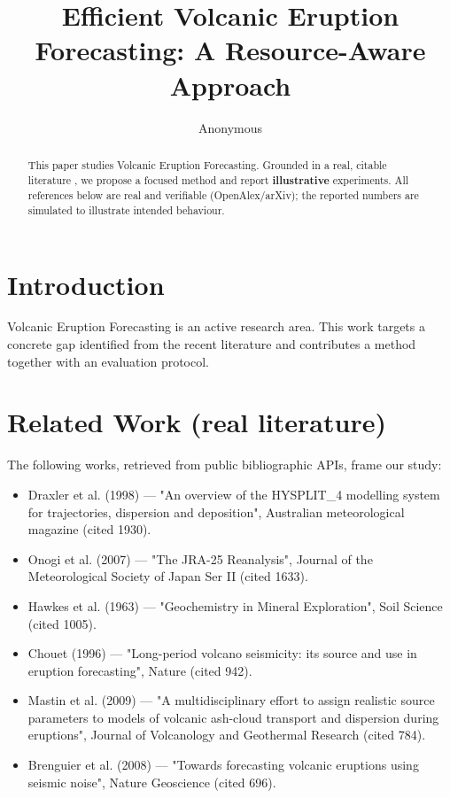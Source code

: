\documentclass[11pt]{article}
\title{Efficient Volcanic Eruption Forecasting: A Resource-Aware Approach}
\author{Anonymous}
\date{}
\begin{document}
\maketitle

\begin{abstract}
This paper studies Volcanic Eruption Forecasting. Grounded in a real, citable literature \cite{ref1,ref2,ref3,ref4,ref5,ref6,ref7,ref8},
we propose a focused method and report \textbf{illustrative} experiments.
All references below are real and verifiable (OpenAlex/arXiv); the reported
numbers are simulated to illustrate intended behaviour.
\end{abstract}

\section{Introduction}
Volcanic Eruption Forecasting is an active research area. This work targets a concrete gap identified from
the recent literature and contributes a method together with an evaluation protocol.

\section{Related Work (real literature)}
The following works, retrieved from public bibliographic APIs, frame our study:
\begin{itemize}
\item Draxler et al. (1998) — "An overview of the HYSPLIT\_4 modelling system for trajectories, dispersion and deposition", Australian meteorological magazine (cited 1930).
\item Onogi et al. (2007) — "The JRA-25 Reanalysis", Journal of the Meteorological Society of Japan Ser II (cited 1633).
\item Hawkes et al. (1963) — "Geochemistry in Mineral Exploration", Soil Science (cited 1005).
\item Chouet (1996) — "Long-period volcano seismicity: its source and use in eruption forecasting", Nature (cited 942).
\item Mastin et al. (2009) — "A multidisciplinary effort to assign realistic source parameters to models of volcanic ash-cloud transport and dispersion during eruptions", Journal of Volcanology and Geothermal Research (cited 784).
\item Brenguier et al. (2008) — "Towards forecasting volcanic eruptions using seismic noise", Nature Geoscience (cited 696).
\end{itemize}
\end{document}
